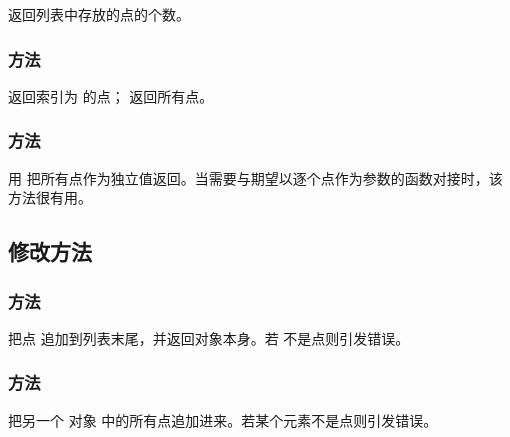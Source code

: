 返回列表中存放的点的个数。

\subsubsection{方法 }
\label{ssub:meth_list_point_get}

 返回索引为  的点； 返回所有点。

\subsubsection{方法 }
\label{ssub:meth_list_point_unpack}

用  把所有点作为独立值返回。当需要与期望以逐个点作为参数的函数对接时，该方法很有用。

\begin{tkzexample}[latex=.5\textwidth]
\begin{center}
\end{center}
\end{tkzexample}

\subsection{修改方法}
\label{subsec:list_point_mutators}

\subsubsection{方法 }
\label{ssub:meth_list_point_add}

把点  追加到列表末尾，并返回对象本身。若  不是点则引发错误。

\subsubsection{方法 }
\label{ssub:meth_list_point_extend}

把另一个  对象  中的所有点追加进来。若某个元素不是点则引发错误。

